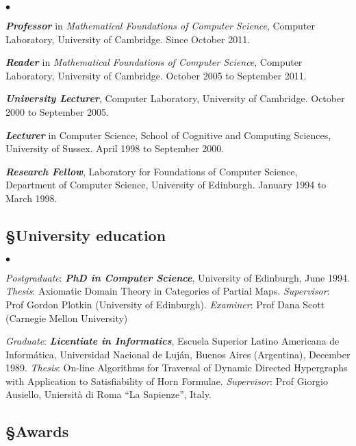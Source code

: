 \documentclass[11pt,twocolumn]{article}
\newenvironment{myitemize}
  {\begin{list}{$\bullet$}
  {\setlength{\topsep}{1pt}
   \setlength{\partopsep}{1pt}
   \setlength{\itemsep}{0pt}
   \setlength{\parsep}{0pt}
   \setlength{\leftmargin}{1em}
   \setlength{\labelwidth}{.5em}}}
  {\end{list}}
\begin{document}
\begin{myitemize}
\item
\textbf{\em Professor} in \emph{Mathematical Foundations of Computer
Science},  Computer Laboratory, University of Cambridge.  Since October
2011.

\item
\textbf{\em Reader} in \emph{Mathematical Foundations of Computer
Science}, Computer Laboratory, University of Cambridge.  October 2005 to
September 2011.

\item
\textbf{\em University Lecturer}, Computer Laboratory, University of
Cambridge.  October 2000 to September 2005.

\item
\textbf{\em Lecturer} in Computer Science, School of Cognitive and
Computing Sciences, University of Sussex.  April 1998 to September 2000. 

\item
\textbf{\em Research Fellow}, Laboratory for Foundations of Computer
Science, Department of Computer Science, University of Edinburgh.  January
1994 to March 1998.
\end{myitemize}

\subsection*{\S\enspace\thinspace University education}

\begin{myitemize}
\item
{\em Postgraduate}: \textbf{\em PhD in Computer Science}, University of
Edinburgh, June 1994.  \emph{Thesis}: Axiomatic Domain Theory in
Categories of Partial Maps.  \emph{Supervisor}: Prof Gordon Plotkin
(University of Edinburgh).  \emph{Examiner}: Prof Dana Scott (Carnegie
Mellon University)

\item
{\em Graduate}: \textbf{\em Licentiate in Informatics}, Escuela Superior
Latino Americana de Inform\'atica, Universidad Nacional de Luj\'an, Buenos
Aires (Argentina), December 1989.  \emph{Thesis}: On-line Algorithms for
Traversal of Dynamic Directed Hypergraphs with Application to
Satisfiability of Horn Formulae.  \emph{Supervisor}: Prof Giorgio
Ausiello, Uniersit\`a di Roma ``La Sapienze'', Italy.
\end{myitemize}

\subsection*{\S\enspace\thinspace Awards}
\end{document}
